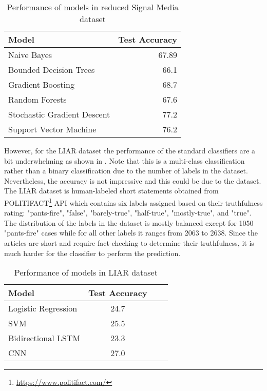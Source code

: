 \begin{table}[h]
\begin{center}
\caption{Performance of models in reduced Signal Media dataset}
\label{tbl:signal_media_performance}
\begin{tabular}{lr}
\toprule 
Model&Test Accuracy\\
\midrule 
Naive Bayes&67.89\\
Bounded Decision Trees&66.1\\
Gradient Boosting&68.7\\
Random Forests&67.6\\
Stochastic Gradient Descent&77.2\\
Support Vector Machine&76.2\\
\bottomrule
\end{tabular}
\end{center}
\end{table}

However, for the LIAR dataset the performance of the standard classifiers are a bit underwhelming as shown in  \cite{wang2017liar}.  Note that this is a multi-class classification rather than a binary classification due to the number of labels in the dataset. Nevertheless, the accuracy is not impressive and this could be due to the dataset.  The LIAR dataset is human-labeled short statements obtained from POLITIFACT\footnote{\url{https://www.politifact.com/}} API which contains six labels assigned based on their truthfulness rating: "pants-fire", "false", "barely-true", "half-true", "mostly-true", and "true". The distribution of the labels in the dataset is mostly balanced except for 1050 "pants-fire" cases while for all other labels it ranges from 2063 to 2638. Since the articles are short and require fact-checking to determine their truthfulness, it is much harder for the classifier to perform the prediction.

\begin{table}[h]
\begin{center}
\caption{Performance of models in LIAR dataset}
\label{tbl:liar_performance}
\begin{tabular}{lccc}
\toprule 
Model&Test Accuracy\\
\midrule 
Logistic Regression&24.7\\
SVM&25.5\\
Bidirectional LSTM&23.3\\
CNN&27.0\\
\bottomrule
\end{tabular}
\end{center}
\end{table}

